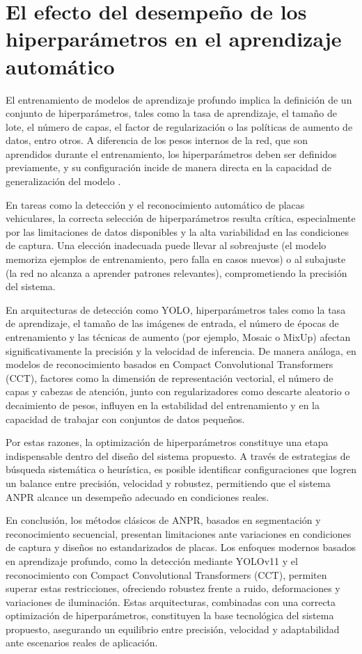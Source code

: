 \section{El efecto del desempeño de los hiperparámetros en el aprendizaje automático}

El entrenamiento de modelos de aprendizaje profundo implica la definición de un conjunto de hiperparámetros,
tales como la tasa de aprendizaje, el tamaño de lote, el número de capas,
el factor de regularización o las políticas de aumento de datos, entro otros.
A diferencia de los pesos internos de la red, que son aprendidos durante el entrenamiento,
los hiperparámetros deben ser definidos previamente,
y su configuración incide de manera directa en la capacidad de generalización del modelo
\cite{hardt2021patternspredictionsactionsstory}.

En tareas como la detección y el reconocimiento automático de placas vehiculares,
la correcta selección de hiperparámetros resulta crítica, 
especialmente por las limitaciones de datos disponibles y
la alta variabilidad en las condiciones de captura.
Una elección inadecuada puede llevar al sobreajuste 
(el modelo memoriza ejemplos de entrenamiento, pero falla en casos nuevos)
o al subajuste (la red no alcanza a aprender patrones relevantes),
comprometiendo la precisión del sistema.

En arquitecturas de detección como YOLO, hiperparámetros tales como la tasa de aprendizaje,
el tamaño de las imágenes de entrada, el número de épocas de entrenamiento y las técnicas de aumento 
(por ejemplo, Mosaic o MixUp) afectan significativamente la precisión y la velocidad de inferencia.
De manera análoga, en modelos de reconocimiento basados en Compact Convolutional Transformers (CCT),
factores como la dimensión de representación vectorial, el número de capas y cabezas de atención,
junto con regularizadores como descarte aleatorio o decaimiento de pesos,
influyen en la estabilidad del entrenamiento y en la capacidad de trabajar con conjuntos de datos pequeños.

Por estas razones, la optimización de hiperparámetros constituye 
una etapa indispensable dentro del diseño del sistema propuesto.
A través de estrategias de búsqueda sistemática o heurística,
es posible identificar configuraciones que logren un balance entre precisión,
velocidad y robustez, permitiendo que el sistema ANPR alcance un desempeño adecuado en condiciones reales.

En conclusión, los métodos clásicos de ANPR, basados en segmentación y reconocimiento secuencial,
presentan limitaciones ante variaciones en condiciones de captura y diseños no estandarizados de placas. 
Los enfoques modernos basados en aprendizaje profundo, como la detección mediante YOLOv11 y
el reconocimiento con Compact Convolutional Transformers (CCT),
permiten superar estas restricciones, ofreciendo robustez frente a ruido,
deformaciones y variaciones de iluminación. 
Estas arquitecturas, combinadas con una correcta optimización de hiperparámetros,
constituyen la base tecnológica del sistema propuesto, asegurando un equilibrio entre precisión,
velocidad y adaptabilidad ante escenarios reales de aplicación.

